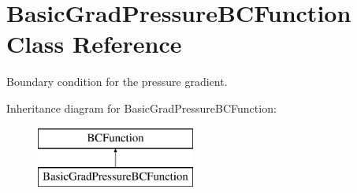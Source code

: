 \hypertarget{class_basic_grad_pressure_b_c_function}{\section{Basic\-Grad\-Pressure\-B\-C\-Function Class Reference}
\label{class_basic_grad_pressure_b_c_function}
}


Boundary condition for the pressure gradient.  


Inheritance diagram for Basic\-Grad\-Pressure\-B\-C\-Function\-:\begin{figure}[H]
\begin{center}
\leavevmode
\includegraphics[height=2.000000cm]{class_basic_grad_pressure_b_c_function}
\end{center}
\end{figure}
